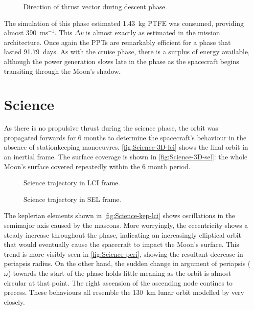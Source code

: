 \begin{figure}
\centering
\def\svgwidth{\figurewidth}

\caption{Direction of thrust vector during descent phase.}
\label{fig:Descent-thrust}
\end{figure}

The simulation of this phase estimated 1.43~kg PTFE was consumed, providing almost 390~ms$^{-1}$. This $\Delta v$ is almost exactly as estimated in the mission architecture. Once again the PPTs are remarkably efficient for a phase that lasted 91.79~days. As with the cruise phase, there is a surplus of energy available, although the power generation slows late in the phase as the spacecraft begins transiting through the Moon's shadow.


\clearpage


\section{Science} \label{sec:Science}

As there is no propulsive thrust during the science phase, the orbit was propagated forwards for 6 months to determine the spacecraft's behaviour in the absence of stationkeeping manoeuvres. \autoref{fig:Science-3D-lci} shows the final orbit in an inertial frame. The surface coverage is shown in \autoref{fig:Science-3D-sel}: the whole Moon's surface covered repeatedly within the 6 month period. 

\begin{figure}
\centering
\def\svgwidth{\figurewidth}

\caption{Science trajectory in LCI frame.}
\label{fig:Science-3D-lci}
\end{figure}

\begin{figure}
\centering
\def\svgwidth{\figurewidth}

\caption{Science trajectory in SEL frame.}
\label{fig:Science-3D-sel}
\end{figure}

The keplerian elements shown in \autoref{fig:Science-kep-lci} shows oscillations in the semimajor axis caused by the mascons. More worryingly, the eccentricity shows a steady increase throughout the phase, indicating an increasingly elliptical orbit that would eventually cause the spacecraft to impact the Moon's surface. This trend is more visibly seen in \autoref{fig:Science-peri}, showing the resultant decrease in periapsis radius. On the other hand, the sudden change in argument of periapsis ($\omega$) towards the start of the phase holds little meaning as the orbit is almost circular at that point. The right ascension of the ascending node contines to precess. These behaviours all resemble the 130~km lunar orbit modelled by \textcite{Gupta2011} very closely.


